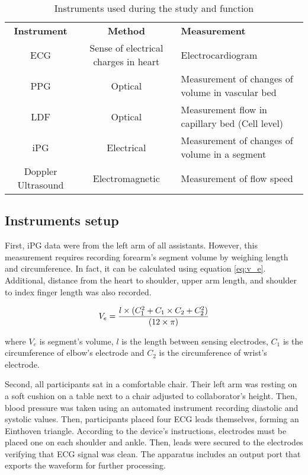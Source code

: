 \begin{table}
	\caption{Instruments used during the study and function}
	\centering
	\label{table:instruments}
	\begin{tabu}{ccp{4.5cm}}
		\hline 
		\textbf{Instrument} & \textbf{Method} & \textbf{Measurement} \\\tabucline[2pt]{-}
		ECG & Sense of electrical charges in heart & Electrocardiogram \\\hline 
		PPG & Optical & Measurement of changes of volume in vascular bed \\\hline 
		LDF & Optical & Measurement flow in capillary bed (Cell level) \\\hline 
		iPG & Electrical & Measurement of changes of volume in a segment \\\hline
		Doppler Ultrasound & Electromagnetic & Measurement of flow speed \\\hline 
	\end{tabu}  
\end{table}


\subsection{Instruments setup}
\label{section procedure 1.1}

First, iPG data were from the left arm of all assistants. However, this measurement requires recording forearm's segment volume by weighing length and circumference. In fact, it can be calculated using equation \ref{eq:v_e}. Additional, distance from the heart to shoulder, upper arm length, and shoulder to index finger length was also recorded. 

\begin{align}
	\label{eq:v_e}
	V_e =\frac{l \times (C_1^2+C_1 \times C_2 + C_2^2)}{(12 \times \pi)} \tagaddtext{[\si{\cubic\centi\meter}]}
\end{align}

where $V_e$ is segment's volume, $l$ is the length between sensing electrodes, $C_1$ is the circumference of elbow's electrode and $C_2$ is the circumference of wrist's electrode.

Second, all participants sat in a comfortable chair. Their left arm was resting on a soft cushion on a table next to a chair adjusted to collaborator's height. Then, blood pressure was taken using an automated instrument recording diastolic and systolic values. Then, participants placed four ECG leads themselves, forming an Einthoven triangle. According to the device's instructions, electrodes must be placed one on each shoulder and ankle. Then, leads were secured to the electrodes verifying that ECG signal was clean. The apparatus includes an output port that exports the waveform for further processing.

